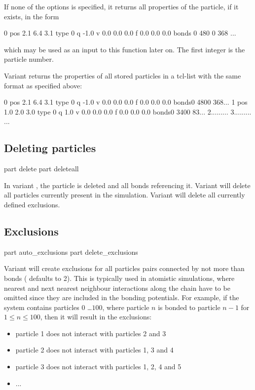 If none of the options is specified, it returns all properties of the
particle, if it exists, in the form
\begin{tclcode}
  0 pos 2.1 6.4 3.1 type 0 q -1.0 v 0.0 0.0 0.0 f 0.0 0.0 0.0
  bonds { {0 480} {0 368} ... } 
\end{tclcode}
which may be used as an input to this function later on. The first
integer is the particle number.

Variant  returns the properties of all stored particles in
a tcl-list with the same format as specified above:
\begin{tclcode}
{0 pos 2.1 6.4 3.1 type 0 q -1.0 v 0.0 0.0 0.0 f 0.0 0.0 0.0
 bonds{{0 480}{0 368}...}} 
{1 pos 1.0 2.0 3.0 type 0 q 1.0 v 0.0 0.0 0.0 f 0.0 0.0 0.0
 bonds{{0 340}{0 83}...}} 
{2...{{...}...}}
{3...{{...}...}}
...
\end{tclcode}

\subsection{Deleting  particles}
\label{tcl:part:delete}

\begin{essyntax}
   part  delete
   part deleteall
\end{essyntax}

In variant , the particle  is deleted
and all bonds referencing it.  Variant  will delete all
particles currently present in the simulation. Variant 
will delete all currently defined exclusions.

\subsection{Exclusions}

\begin{essyntax}
   part auto_exclusions 
   part delete_exclusions
\end{essyntax}

Variant  will create exclusions for all particles pairs
connected by not more than  bonds ( defaults to
2). This is typically used in atomistic simulations, where nearest and
next nearest neighbour interactions along the chain have to be omitted
since they are included in the bonding potentials. For example, if the
system contains particles $0$ \dots $100$, where particle $n$ is
bonded to particle $n-1$ for $1 \leq n \leq 100$, then it will result
in the exclusions:
\begin{itemize}
  \item particle 1 does not interact with particles 2 and 3
  \item particle 2 does not interact with particles 1, 3 and 4
  \item particle 3 does not interact with particles 1, 2, 4 and 5
  \item ...
\end{itemize}

